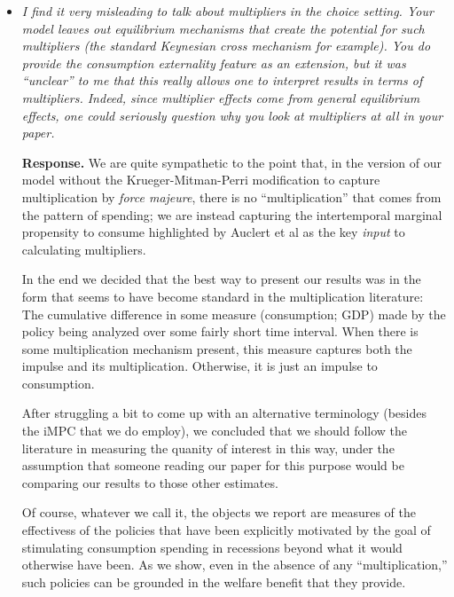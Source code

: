 \documentclass[12pt,letterpaper,english]{article}
\begin{document}
\begin{enumerate}
\begin{itemize}
	\item \textit{I find it very misleading to talk about multipliers in the choice setting. Your model leaves out equilibrium mechanisms that create the potential for such multipliers (the standard Keynesian cross mechanism for example). You do provide the consumption externality feature as an extension, but it was ``unclear'' to me that this really allows one to interpret results in terms of multipliers. Indeed, since multiplier effects come from general equilibrium effects, one could seriously question why you look at multipliers at all in your paper.}
	
          \noindent \textbf{Response.} We are quite sympathetic to the point that, in the version of our model without the Krueger-Mitman-Perri modification to capture multiplication by \textit{force majeure}, there is no ``multiplication'' that comes from the pattern of spending; we are instead capturing the intertemporal marginal propensity to consume highlighted by Auclert et al as the key \textit{input} to calculating multipliers. 

          In the end we decided that the best way to present our results was in the form that seems to have become standard in the multiplication literature: The cumulative difference in some measure (consumption; GDP) made by the policy being analyzed over some fairly short time interval. When there is some multiplication mechanism present, this measure captures both the impulse and its multiplication.  Otherwise, it is just an impulse to consumption.

          After struggling a bit to come up with an alternative terminology (besides the iMPC that we do employ), we concluded that we should follow the literature in measuring the quanity of interest in this way, under the assumption that someone reading our paper for this purpose would be comparing our results to those other estimates.  %

          Of course, whatever we call it, the objects we report are measures of the effectivess of the policies that have been explicitly motivated by the goal of stimulating consumption spending in recessions beyond what it would otherwise have been. As we show, even in the absence of any ``multiplication,'' such policies can be grounded in the welfare benefit that they provide.


\end{itemize}
\end{enumerate}
\end{document}
